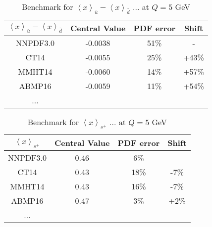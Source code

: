 \begin{table}[t]
\centering
\begin{tabular}{|c||c|c|c|}
\hline 
\rule[-3 ex]{0pt}{7 ex}  %
$\left\langle x\right\rangle _{\bar{u}}-\left\langle x\right\rangle _{\bar{d}}$ 
   & Central Value & PDF error & Shift\\
\hline 
\hline 
NNPDF3.0 & -0.0038 & 51\% & -\\
\hline 
CT14 & -0.0055 & 25\% & +43\%\\
\hline 
MMHT14 & -0.0060 & 14\% & +57\%\\
\hline 
ABMP16 & -0.0059 & 11\% & +54\%\\
\hline 
... &  &  & \\
\hline 
\end{tabular}

\caption{Benchmark for $\left\langle x\right\rangle _{\bar{u}}-\left\langle x\right\rangle _{\bar{d}}$
... at $Q=5$ GeV}
\end{table}

\begin{table}[t]
\centering
\begin{tabular}{|c||c|c|c|}
\hline 
\rule[-3 ex]{0pt}{7 ex}  %
$\left\langle x\right\rangle _{s^{+}}$ 
   & Central Value & PDF error & Shift\\
\hline 
\hline 
NNPDF3.0 & 0.46 & 6\% & -\\
\hline 
CT14 & 0.43 & 18\% & -7\%\\
\hline 
MMHT14 & 0.43 & 16\% & -7\%\\
\hline 
ABMP16 & 0.47 & 3\% & +2\%\\
\hline 
... &  &  & \\
\hline 
\end{tabular}

\caption{Benchmark for $\left\langle x\right\rangle _{s^{+}}$ ... at $Q=5$
GeV}
\end{table}

